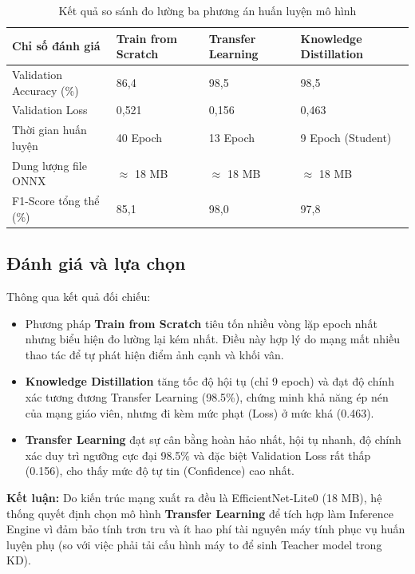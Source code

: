 \documentclass[12pt,a4paper]{report}
\begin{document}
\begin{table}[H]
  \centering
  \caption{Kết quả so sánh đo lường ba phương án huấn luyện mô hình}
  \label{tab:model_comparison}
  \begin{tabular}{p{4cm} p{3.2cm} p{3.2cm} p{4cm}}
    \toprule
    \textbf{Chỉ số đánh giá} & \textbf{Train from Scratch} & \textbf{Transfer Learning} & \textbf{Knowledge Distillation} \\
    \midrule
    Validation Accuracy (\%) & 86{,}4 & 98{,}5 & 98{,}5 \\
    Validation Loss & 0{,}521 & 0{,}156 & 0{,}463 \\
    Thời gian huấn luyện & 40 Epoch & 13 Epoch & 9 Epoch (Student) \\
    Dung lượng file ONNX & $\approx$ 18 MB & $\approx$ 18 MB & $\approx$ 18 MB \\
    F1-Score tổng thể (\%) & 85{,}1 & 98{,}0 & 97{,}8 \\
    \bottomrule
  \end{tabular}
\end{table}

\subsection{Đánh giá và lựa chọn}
Thông qua kết quả đối chiếu:
\begin{itemize}
    \item Phương pháp \textbf{Train from Scratch} tiêu tốn nhiều vòng lặp epoch nhất nhưng biểu hiện đo lường lại kém nhất. Điều này hợp lý do mạng mất nhiều thao tác để tự phát hiện điểm ảnh cạnh và khối vân.
    \item \textbf{Knowledge Distillation} tăng tốc độ hội tụ (chỉ 9 epoch) và đạt độ chính xác tương đương Transfer Learning (98.5\%), chứng minh khả năng ép nén của mạng giáo viên, nhưng đi kèm mức phạt (Loss) ở mức khá (0.463).
    \item \textbf{Transfer Learning} đạt sự cân bằng hoàn hảo nhất, hội tụ nhanh, độ chính xác duy trì ngưỡng cực đại 98.5\% và đặc biệt Validation Loss rất thấp (0.156), cho thấy mức độ tự tin (Confidence) cao nhất.
\end{itemize}
\textbf{Kết luận:} Do kiến trúc mạng xuất ra đều là EfficientNet-Lite0 (18 MB), hệ thống quyết định chọn mô hình \textbf{Transfer Learning} để tích hợp làm Inference Engine vì đảm bảo tính trơn tru và ít hao phí tài nguyên máy tính phục vụ huấn luyện phụ (so với việc phải tải cấu hình máy to để sinh Teacher model trong KD).
\end{document}
